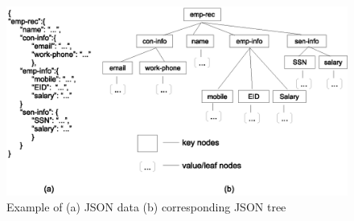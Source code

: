 	\begin{figure} [t]
 		\centering
 		\includegraphics[width=1\textwidth]{NSS16/JSON-example}
 		\caption{Example of (a) JSON data (b) corresponding JSON tree}
 		\label{fig:JSON-example}
 	\end{figure}